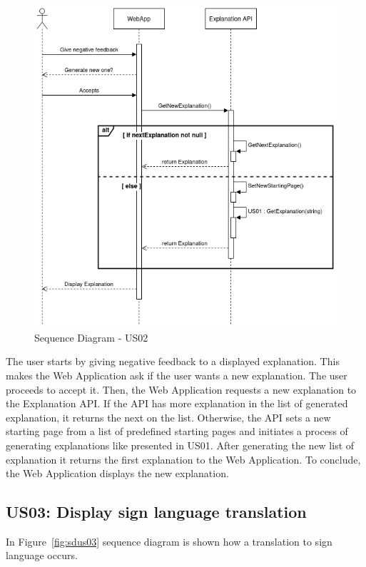 \begin{figure}[H]
\centering
\includegraphics[scale=0.45]{ch4/assets/US02_SD.png}
\caption[Sequence Diagram US02]{Sequence Diagram - US02}
\label{fig:sdus02}
\end{figure}

The user starts by giving negative feedback to a displayed explanation.
This makes the Web Application ask if the user wants a new explanation.
The user proceeds to accept it.
Then, the Web Application requests a new explanation to the Explanation API.
If the API has more explanation in the list of generated explanation, it returns the next on the list.
Otherwise, the API sets a new starting page from a list of predefined starting pages and initiates a process of generating explanations like presented in US01.
After generating the new list of explanation it returns the first explanation to the Web Application.
To conclude, the Web Application displays the new explanation.

\subsection{US03: Display sign language translation}

In Figure~\ref{fig:sdus03} sequence diagram is shown how a translation to sign language occurs.

